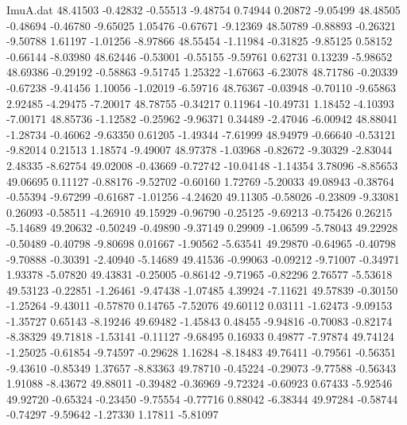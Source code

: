 \begin{filecontents}{ImuA.dat}
  48.41503   -0.42832   -0.55513   -9.48754    0.74944    0.20872   -9.05499
  48.48505   -0.48694   -0.46780   -9.65025    1.05476   -0.67671   -9.12369
  48.50789   -0.88893   -0.26321   -9.50788    1.61197   -1.01256   -8.97866
  48.55454   -1.11984   -0.31825   -9.85125    0.58152   -0.66144   -8.03980
  48.62446   -0.53001   -0.55155   -9.59761    0.62731    0.13239   -5.98652
  48.69386   -0.29192   -0.58863   -9.51745    1.25322   -1.67663   -6.23078
  48.71786   -0.20339   -0.67238   -9.41456    1.10056   -1.02019   -6.59716
  48.76367   -0.03948   -0.70110   -9.65863    2.92485   -4.29475   -7.20017
  48.78755   -0.34217    0.11964  -10.49731    1.18452   -4.10393   -7.00171
  48.85736   -1.12582   -0.25962   -9.96371    0.34489   -2.47046   -6.00942
  48.88041   -1.28734   -0.46062   -9.63350    0.61205   -1.49344   -7.61999
  48.94979   -0.66640   -0.53121   -9.82014    0.21513    1.18574   -9.49007
  48.97378   -1.03968   -0.82672   -9.30329   -2.83044    2.48335   -8.62754
  49.02008   -0.43669   -0.72742  -10.04148   -1.14354    3.78096   -8.85653
  49.06695    0.11127   -0.88176   -9.52702   -0.60160    1.72769   -5.20033
  49.08943   -0.38764   -0.55394   -9.67299   -0.61687   -1.01256   -4.24620
  49.11305   -0.58026   -0.23809   -9.33081    0.26093   -0.58511   -4.26910
  49.15929   -0.96790   -0.25125   -9.69213   -0.75426    0.26215   -5.14689
  49.20632   -0.50249   -0.49890   -9.37149    0.29909   -1.06599   -5.78043
  49.22928   -0.50489   -0.40798   -9.80698    0.01667   -1.90562   -5.63541
  49.29870   -0.64965   -0.40798   -9.70888   -0.30391   -2.40940   -5.14689
  49.41536   -0.99063   -0.09212   -9.71007   -0.34971    1.93378   -5.07820
  49.43831   -0.25005   -0.86142   -9.71965   -0.82296    2.76577   -5.53618
  49.53123   -0.22851   -1.26461   -9.47438   -1.07485    4.39924   -7.11621
  49.57839   -0.30150   -1.25264   -9.43011   -0.57870    0.14765   -7.52076
  49.60112    0.03111   -1.62473   -9.09153   -1.35727    0.65143   -8.19246
  49.69482   -1.45843    0.48455   -9.94816   -0.70083   -0.82174   -8.38329
  49.71818   -1.53141   -0.11127   -9.68495    0.16933    0.49877   -7.97874
  49.74124   -1.25025   -0.61854   -9.74597   -0.29628    1.16284   -8.18483
  49.76411   -0.79561   -0.56351   -9.43610   -0.85349    1.37657   -8.83363
  49.78710   -0.45224   -0.29073   -9.77588   -0.56343    1.91088   -8.43672
  49.88011   -0.39482   -0.36969   -9.72324   -0.60923    0.67433   -5.92546
  49.92720   -0.65324   -0.23450   -9.75554   -0.77716    0.88042   -6.38344
  49.97284   -0.58744   -0.74297   -9.59642   -1.27330    1.17811   -5.81097

\end{filecontents}
